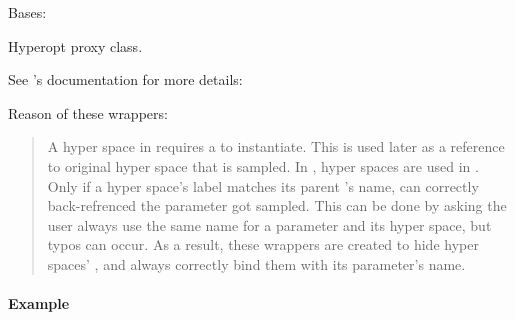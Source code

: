\documentclass[letterpaper,10pt,english]{sphinxmanual}
\begin{document}
\begin{fulllineitems}
\label{\detokenize{matchzoo.engine:matchzoo.engine.hyper_spaces.HyperoptProxy}}
Bases: 

Hyperopt proxy class.

See ’s documentation for more details:

Reason of these wrappers:
\begin{quote}

A hyper space in  requires a  to instantiate. This
 is used later as a reference to original hyper space that is
sampled. In , hyper spaces are used in
. Only if a hyper space’s label
matches its parent ’s name, 
can correctly back-refrenced the parameter got sampled. This can be
done by asking the user always use the same name for a parameter and
its hyper space, but typos can occur. As a result, these wrappers
are created to hide hyper spaces’ , and always correctly
bind them with its parameter’s name.
\end{quote}
\paragraph{Example}

%
\begin{sphinxVerbatim}[commandchars=\\\{\}]
   
  \PYG{p}{[}  \PYG{p}{]}
  
     
\end{sphinxVerbatim}

\end{fulllineitems}
\end{document}
